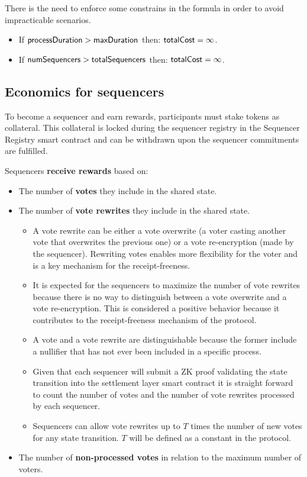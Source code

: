 There is the need to enforce some constrains in the formula in order to avoid impracticable scenarios.

\begin{itemize}
	\item If ${\sf{processDuration}} > {\sf{maxDuration}}$ then: ${\sf{totalCost}} = \infty$.
	\item If ${\sf{numSequencers}} > {\sf{totalSequencers}}$ then: ${\sf{totalCost}} = \infty$.
\end{itemize}

\subsection{Economics for sequencers}

To become a sequencer and earn rewards, participants must stake \token tokens as collateral. This collateral is locked during the sequencer registry in the Sequencer Registry smart contract and can be withdrawn upon the sequencer commitments are fulfilled.

Sequencers \textbf{receive rewards} based on:

\begin{itemize}
	\item The number of \textbf{votes} they include in the shared state.
	\item The number of \textbf{vote rewrites} they include in the shared state.
	\begin{itemize}
		\item A vote rewrite can be either a vote overwrite (a voter casting another vote that overwrites the previous one) or a vote re-encryption (made by the sequencer). Rewriting votes enables more flexibility for the voter and is a key mechanism for the receipt-freeness.
		\item It is expected for the sequencers to maximize the number of vote rewrites because there is no way to distinguish between a vote overwrite and a vote re-encryption. This is considered a positive behavior because it contributes to the receipt-freeness mechanism of the protocol.
		\item A vote and a vote rewrite are distinguishable because the former include a nullifier that has not ever been included in a specific process.
		\item Given that each sequencer will submit a ZK proof validating the state transition into the settlement layer smart contract it is straight forward to count the number of votes and the number of vote rewrites processed by each sequencer.
		\item Sequencers can allow vote rewrites up to $T$ times the number of new votes for any state transition. $T$ will be defined as a constant in the protocol.
	\end{itemize}
	\item The number of \textbf{non-processed votes} in relation to the maximum number of voters.
\end{itemize}

